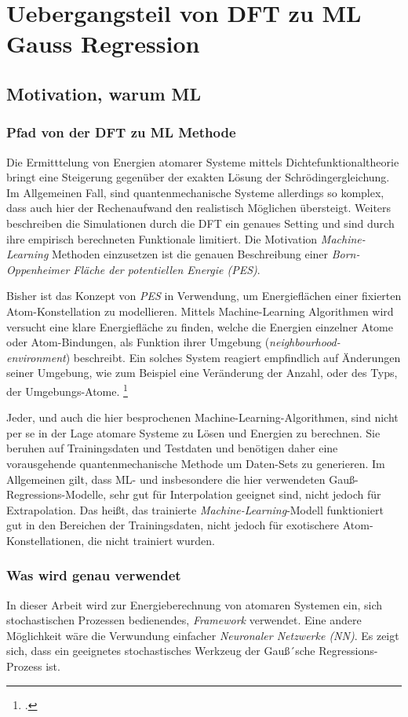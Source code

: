 \chapter{Uebergangsteil von DFT zu ML Gauss Regression}

\section{Motivation, warum ML}
\subsection{Pfad von der DFT zu ML Methode}
Die Ermitttelung von Energien atomarer Systeme mittels Dichtefunktionaltheorie bringt eine Steigerung gegenüber der exakten Lösung der Schrödingergleichung. Im Allgemeinen Fall, sind quantenmechanische Systeme allerdings so komplex, dass auch hier der Rechenaufwand den realistisch Möglichen übersteigt. Weiters beschreiben die Simulationen durch die DFT ein genaues Setting und sind durch ihre empirisch berechneten Funktionale limitiert. 
Die Motivation \textit{Machine-Learning} Methoden einzusetzen ist die genauen Beschreibung einer \textit{Born-Oppenheimer Fläche der potentiellen Energie (PES)}. 

Bisher ist das Konzept von \textit{PES} in Verwendung, um Energieflächen einer fixierten Atom-Konstellation zu modellieren. Mittels Machine-Learning Algorithmen wird versucht eine klare Energiefläche zu finden, welche die Energien einzelner Atome oder Atom-Bindungen, als Funktion ihrer Umgebung (\textit{neighbourhood-environment}) beschreibt. Ein solches System reagiert empfindlich auf Änderungen seiner Umgebung, wie zum Beispiel eine Veränderung der Anzahl, oder des Typs, der Umgebungs-Atome. \footcite[1051]{GAP-intro}

Jeder, und auch die hier besprochenen Machine-Learning-Algorithmen, sind nicht per se in der Lage atomare Systeme zu Lösen und Energien zu berechnen. Sie beruhen auf Trainingsdaten und Testdaten und benötigen daher eine vorausgehende quantenmechanische Methode um Daten-Sets zu generieren. Im Allgemeinen gilt, dass ML- und insbesondere die hier verwendeten Gauß-Regressions-Modelle, sehr gut  für Interpolation geeignet sind, nicht jedoch für Extrapolation. Das heißt, das trainierte \textit{Machine-Learning}-Modell funktioniert gut in den Bereichen der Trainingsdaten, nicht jedoch für exotischere Atom-Konstellationen, die nicht trainiert wurden.

\subsection{Was wird genau verwendet}
In dieser Arbeit wird zur Energieberechnung von atomaren Systemen ein, sich stochastischen Prozessen bedienendes, \textit{Framework} verwendet. Eine andere Möglichkeit wäre die Verwundung einfacher \textit{Neuronaler Netzwerke (NN)}. Es zeigt sich, dass ein geeignetes stochastisches Werkzeug der Gauß´sche Regressions-Prozess ist.

